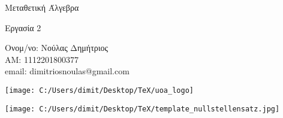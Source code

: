 \documentclass[oneside,a4paper]{article}
\newcommand {\tl}{\textlatin}
\begin{document}
	
	
	\begin{framed}	
		\begin{center}
			\huge Μεταθετική Άλγεβρα
		\end{center}
		\begin{center}
			\huge Εργασία 2
		\end{center}
		\vspace{0.3truecm}
		\begin{center}
			Ονομ/νο: Νούλας Δημήτριος\\
			ΑΜ: 1112201800377\\
			\tl{email}: \tl{dimitriosnoulas@gmail.com}
		\end{center}
		\vspace{0.3truecm}
	\end{framed}
	\vspace*{\fill}
	\begin{center}
	\texttt{[image: C:/Users/dimit/Desktop/TeX/uoa\_logo]}
	\end{center}
\vspace{1cm}
\pagebreak

\begin{center}
	\texttt{[image: C:/Users/dimit/Desktop/TeX/template\_nullstellensatz.jpg]}
	\end{center}
\pagebreak
\end{document}
